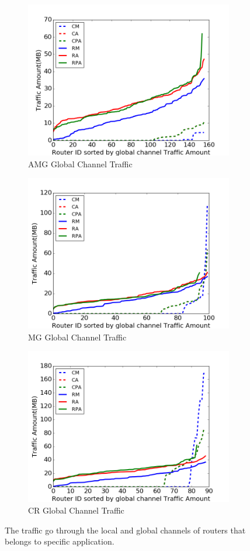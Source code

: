 \documentclass[conference,compsoc]{IEEEtran}
\begin{document}
\begin{figure}[t]
    \centering
    \begin{subfigure}[t]{0.32\textwidth}
        \centering
        \includegraphics[height=1.8 in]{amg/gc-traffic}
        \caption{AMG Global Channel Traffic}
        \label{fig:amg-gc-traffic}
    \end{subfigure}\hfill
    \hspace{1em}%
    \begin{subfigure}[t]{0.32\textwidth}
        \centering
        \includegraphics[height=1.8 in]{mg/gc-traffic}
        \caption{MG Global Channel Traffic}
        \label{fig:mg-gc-traffic}
    \end{subfigure}\hfill
    \begin{subfigure}[t]{0.32\textwidth}
        \centering
        \includegraphics[height=1.8 in]{cr/gc-traffic}
        \caption{CR Global Channel Traffic}
        \label{fig:cr-gc-traffic}
    \end{subfigure}%
   \caption{The traffic go through the local and global channels of routers that belongs to specific application.}
   \label{fig:3app-lc-gc-traffic}
\end{figure}
\end{document}
